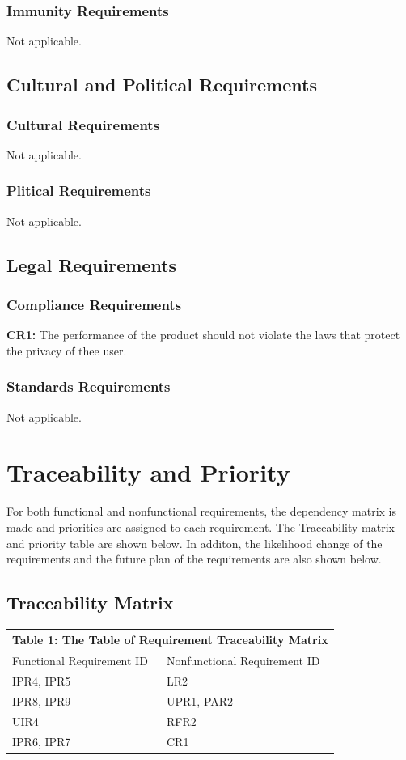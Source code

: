 \documentclass[12pt]{article}
\begin{document}
\subsubsection{Immunity Requirements}
Not applicable.
\subsection{Cultural and Political Requirements}
\subsubsection{Cultural Requirements}
Not applicable.
\subsubsection{Plitical Requirements}
Not applicable.
\subsection{Legal Requirements}
\subsubsection{Compliance Requirements}
\textbf{CR1:} The performance of the product should not violate the laws that protect the privacy of thee user.
\subsubsection{Standards Requirements}
Not applicable.


\section{Traceability and Priority}
For both functional and nonfunctional requirements, the dependency matrix is made and priorities are assigned to each requirement. The Traceability matrix and priority table are shown below. In additon, the likelihood change of the requirements and the future plan of the requirements are also shown below.

\subsection{Traceability Matrix}
\begin{tabular}{|p{}| p{}|}
\hline \multicolumn{2}{|c|}{Table 1: The Table of Requirement Traceability Matrix}\\

\hline Functional Requirement ID&Nonfunctional Requirement ID\\

\hline IPR4, IPR5&LR2\\

\hline IPR8, IPR9&UPR1, PAR2\\
\hline UIR4&RFR2\\
\hline IPR6, IPR7&CR1\\
\hline

\end{tabular}
\end{document}
